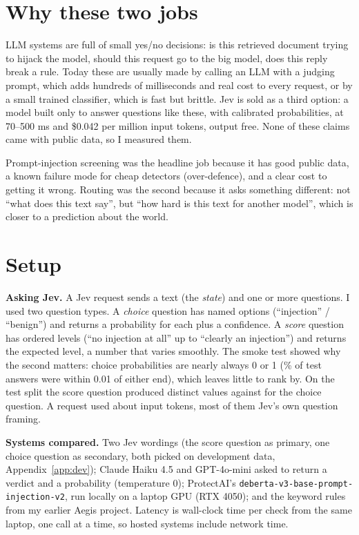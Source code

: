 \documentclass[11pt]{article}
\begin{document}
\section{Why these two jobs}

LLM systems are full of small yes/no decisions: is this retrieved document
trying to hijack the model, should this request go to the big model, does this
reply break a rule. Today these are usually made by calling an LLM with a
judging prompt, which adds hundreds of milliseconds and real cost to every
request, or by a small trained classifier, which is fast but brittle. Jev is
sold as a third option: a model built only to answer questions like these, with
calibrated probabilities, at 70--500 ms and \$0.042 per million input tokens,
output free. None of these claims came with public data, so I measured them.

Prompt-injection screening was the headline job because it has good public
data, a known failure mode for cheap detectors (over-defence), and a clear cost
to getting it wrong. Routing was the second because it asks something
different: not ``what does this text say'', but ``how hard is this text for
another model'', which is closer to a prediction about the world.

\section{Setup}

\textbf{Asking Jev.} A Jev request sends a text (the \emph{state}) and one or
more questions. I used two question types. A \emph{choice} question has named
options (``injection'' / ``benign'') and returns a probability for each plus a
confidence. A \emph{score} question has ordered levels (``no injection at all''
up to ``clearly an injection'') and returns the expected level, a number that
varies smoothly. The smoke test showed why the second matters: choice
probabilities are nearly always 0 or 1 (\ChoiceSaturated\% of test answers were
within 0.01 of either end), which leaves little to rank by. On the test split
the score question produced \ScoreDistinct{} distinct values against
\ChoiceDistinct{} for the choice question. A request used about \JevTokens{}
input tokens, most of them Jev's own question framing.

\textbf{Systems compared.} Two Jev wordings (the score question as primary, one
choice question as secondary, both picked on development data, Appendix~\ref{app:dev});
Claude Haiku 4.5 and GPT-4o-mini asked to return a verdict and a probability
(temperature 0); ProtectAI's \texttt{deberta-v3-base-prompt-injection-v2}, run
locally on a laptop GPU (RTX 4050); and the keyword rules from my earlier Aegis
project. Latency is wall-clock time per check from the same laptop, one call at
a time, so hosted systems include network time.
\end{document}
